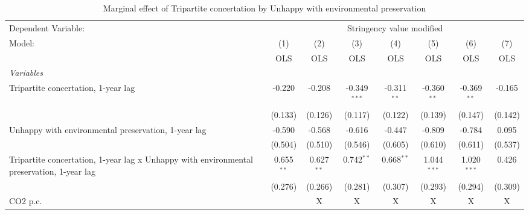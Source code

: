 
\begin{table}[htbp]
   \caption{Marginal effect of Tripartite concertation by Unhappy with environmental preservation}
   \centering
   \begin{tabular}{lccccccc}
      \toprule
      Dependent Variable: & \multicolumn{7}{c}{Stringency value modified}\\
      Model:                                                                                    & (1)          & (2)          & (3)            & (4)           & (5)           & (6)           & (7)\\  
                                                                                                &  OLS         & OLS          & OLS            & OLS           & OLS           & OLS           & OLS\\  
      \midrule
      \emph{Variables}\\
      Tripartite concertation, 1-year lag                                                       & -0.220       & -0.208       & -0.349$^{***}$ & -0.311$^{**}$ & -0.360$^{**}$ & -0.369$^{**}$ & -0.165\\   
                                                                                                & (0.133)      & (0.126)      & (0.117)        & (0.122)       & (0.139)       & (0.147)       & (0.142)\\   
      Unhappy with environmental preservation, 1-year lag                                       & -0.590       & -0.568       & -0.616         & -0.447        & -0.809        & -0.784        & 0.095\\   
                                                                                                & (0.504)      & (0.510)      & (0.546)        & (0.605)       & (0.610)       & (0.611)       & (0.537)\\   
      Tripartite concertation, 1-year lag x Unhappy with environmental preservation, 1-year lag & 0.655$^{**}$ & 0.627$^{**}$ & 0.742$^{**}$   & 0.668$^{**}$  & 1.044$^{***}$ & 1.020$^{***}$ & 0.426\\   
                                                                                                & (0.276)      & (0.266)      & (0.281)        & (0.307)       & (0.293)       & (0.294)       & (0.309)\\   
      CO2 p.c.                                                                                  &              & X            & X              & X             & X             & X             & X\\  

\end{tabular}
\end{table}
